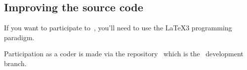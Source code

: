 \documentclass{tutodoc}
\begin{document}

\subsection{Improving the source code}

\begin{tdocimp}
    If you want to participate to \thisproj\,, you'll need to use the \LaTeX3 programming paradigm.
\end{tdocimp}


Participation as a coder is made via the repository \thisrepo\ which is the \thisrepo\ development branch.
\end{document}

